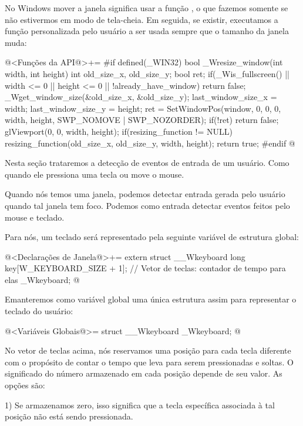 
No Windows mover a janela significa usar a
função , o que fazemos somente se não
estivermos em modo de tela-cheia. Em seguida, se existir, executamos a
função personalizada pelo usuário a ser usada sempre que o tamanho da
janela muda:

\iniciocodigo
@<Funções da API@>+=
#if defined(_WIN32)
bool _Wresize_window(int width, int height){
  int old_size_x, old_size_y;
  bool ret;
  if(_Wis_fullscreen() || width <= 0 || height <= 0 || !already_have_window)
    return false;
  _Wget_window_size(&old_size_x, &old_size_y);
  last_window_size_x = width;
  last_window_size_y = height;
  ret = SetWindowPos(window, 0, 0, 0, width, height, SWP_NOMOVE | SWP_NOZORDER);
  if(!ret)
    return false;
  glViewport(0, 0, width, height);
  if(resizing_function != NULL)
    resizing_function(old_size_x, old_size_y, width, height);
  return true;
}
#endif
@



Nesta seção trataremos a detecção de eventos de entrada de um
usuário. Como quando ele pressiona uma tecla ou move o mouse.


Quando nós temos uma janela, podemos detectar entrada gerada pelo
usuário quando tal janela tem foco. Podemos como entrada detectar
eventos feitos pelo mouse e teclado.

Para nós, um teclado será representado pela seguinte variável de
estrutura global:

\iniciocodigo
@<Declarações de Janela@>+=
extern struct __Wkeyboard{
  long key[W_KEYBOARD_SIZE + 1]; // Vetor de teclas: contador de tempo para elas
} _Wkeyboard;
@
\fimcodigo

Emanteremos como variável global uma única estrutura assim para
representar o teclado do usuário:

\iniciocodigo
@<Variáveis Globais@>=
struct __Wkeyboard _Wkeyboard;
@
\fimcodigo


No vetor de teclas acima, nós reservamos uma posição para cada tecla
diferente com o propósito de contar o tempo que leva para serem
pressionadas e soltas. O significado do número armazenado em cada
posição depende de seu valor. As opções são:

1) Se armazenamos zero, isso significa que a tecla específica
associada à tal posição não está sendo pressionada.

